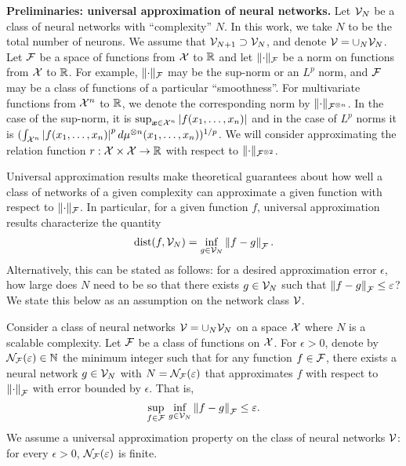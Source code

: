 \textbf{Preliminaries: universal approximation of neural networks.} Let ${\mathcal{V}}_N$ be a class of neural networks with ``complexity'' $N$. In this work, we take $N$ to be the total number of neurons. We assume that ${\mathcal{V}}_{N+1} \supset {\mathcal{V}}_N$, and denote ${\mathcal{V}} = \cup_N{{\mathcal{V}}_N}$. Let ${\mathcal{F}}$ be a space of functions from ${\mathcal{X}}$ to $\mathbb{R}$ and let $\lVert\cdot\rVert_{\mathcal{F}}$ be a norm on functions from ${\mathcal{X}}$ to $\mathbb{R}$. For example, $\lVert\cdot\rVert_{\mathcal{F}}$ may be the sup-norm or an $L^p$ norm, and ${\mathcal{F}}$ may be a class of functions of a particular ``smoothness''. For multivariate functions from ${\mathcal{X}}^n$ to $\mathbb{R}$, we denote the corresponding norm by $\lVert\cdot\rVert_{{\mathcal{F}}^{\otimes n}}$. In the case of the sup-norm, it is $\sup_{\bm{x} \in {\mathcal{X}}^n} \left\lvert f(x_1, \ldots, x_n)\right\rvert$ and in the case of $L^p$ norms it is $(\int_{{\mathcal{X}}^n} \left\lvert f(x_1, \ldots, x_n)\right\rvert^p d\mu^{\otimes n}(x_1, \ldots, x_n))^{1/p}$. We will consider approximating the relation function $r: {\mathcal{X}} \times {\mathcal{X}} \to \mathbb{R}$ with respect to $\lVert\cdot\rVert_{{\mathcal{F}}^{\otimes 2}}$.

Universal approximation results make theoretical guarantees about how well a class of networks of a given complexity can approximate a given function with respect to $\lVert\cdot\rVert_{\mathcal{F}}$. In particular, for a given function $f$, universal approximation results characterize the quantity
\[\mathrm{dist}(f, {\mathcal{V}}_N) = \inf_{g \in {\mathcal{V}}_N} \left\lVert f - g\right\rVert_{{\mathcal{F}}}.\]
Alternatively, this can be stated as follows: for a desired approximation error $\epsilon$, how large does $N$ need to be so that there exists $g \in {\mathcal{V}}_N$ such that $\left\lVert f - g\right\rVert_{{\mathcal{F}}} \leq \varepsilon$? We state this below as an assumption on the network class ${\mathcal{V}}$.

\begin{assumption}\label{ass:univ_approx_efficiency}
	Consider a class of neural networks ${\mathcal{V}} = \cup_N {\mathcal{V}}_N$ on a space ${\mathcal{X}}$ where $N$ is a scalable complexity. Let ${\mathcal{F}}$ be a class of functions on ${\mathcal{X}}$. For $\epsilon > 0$, denote by ${\mathcal{N}}_{\mathcal{F}}(\varepsilon) \in \mathbb{N}$ the minimum integer such that for any function $f \in {\mathcal{F}}$, there exists a neural network $g \in {\mathcal{V}}_N$ with $N = {\mathcal{N}}_{\mathcal{F}}(\varepsilon)$ that approximates $f$ with respect to $\left\lVert\cdot\right\rVert_{\mathcal{F}}$ with error bounded by $\epsilon$. That is,
	\begin{equation*}
		\sup_{f \in \calF} \, \inf_{g \in \calV_N} \norm{f - g}_{\calF} \leq \epsilon.
	\end{equation*}
	We assume a universal approximation property on the class of neural networks ${\mathcal{V}}$: for every $\epsilon > 0$, ${\mathcal{N}}_{\mathcal{F}}(\varepsilon)$ is finite.
\end{assumption}

